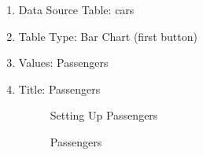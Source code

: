 \begin{enumerate}
  \item Data Source Table: cars
  \item Table Type: Bar Chart (first button)
  \item Values: Passengers 
  \item Title: Passengers
  
  \begin{figure}[H]
    \begin{center}
      \caption{Setting Up Passengers}
    \end{center}
  \end{figure}
  
  \begin{figure}[H]
    \begin{center}
      \caption{Passengers}
    \end{center}
  \end{figure}
  
\end{enumerate}


